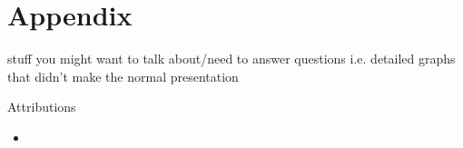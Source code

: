 \documentclass[
]{upbbeamer2023}
\begin{document}
\section*{Appendix}\sectionframe

\begin{frame}{\secname}
    stuff you might want to talk about/need to answer questions
    i.e. detailed graphs that didn't make the normal presentation
\end{frame}

\begin{frame}{Attributions}
\begin{itemize}
    \item 
\end{itemize}
\end{frame}
\end{document}
